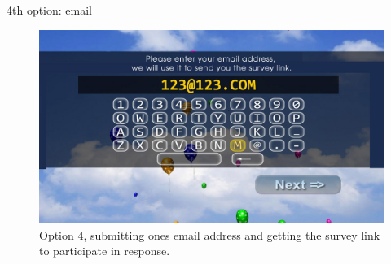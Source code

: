    4th option: email

    \begin{figure}
        \begin{center}
            \includegraphics[width=\columnwidth]{img/screenshots/option-email.jpg}
        \end{center}
     \caption{Option 4, submitting ones email address and getting the survey link to participate in response.}
     \label{screenshot:email-option}
    \end{figure}